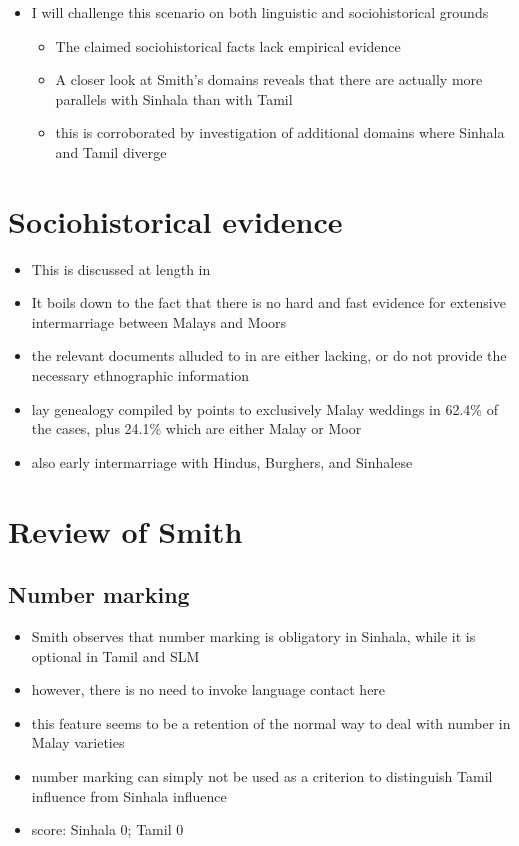 \documentclass[a4paper,12pt]{article}
\begin{document}
\begin{itemize}
 \item I will challenge this scenario on both linguistic and sociohistorical grounds
	\begin{itemize}
	\item The claimed sociohistorical facts lack empirical evidence
	\item A closer look at Smith's domains reveals that there are actually more parallels with Sinhala than with Tamil
	\item this is corroborated by investigation of additional domains where Sinhala and Tamil diverge
	\end{itemize}
\end{itemize}

\section{Sociohistorical evidence}
\begin{itemize}
 \item This is discussed at length in \citet[40-47]{Nordhoff2009phd}
 \item It boils down to the fact that there is no hard and fast evidence for extensive intermarriage between Malays and Moors
 \item the relevant documents alluded to in \citet{Hussainmiya1987,Hussainmiya1990} are either lacking, or do not provide the necessary ethnographic information \citep{Ansaldo2008genesis}
\item lay genealogy compiled by \citet{Burah2006} points to exclusively Malay weddings in 62.4\% of the cases, plus 24.1\% which are either Malay or Moor
\item also early intermarriage with  Hindus, Burghers, and Sinhalese
\end{itemize}

\section{Review of Smith}
\subsection{Number marking}
\begin{itemize}
 \item Smith observes that number marking is obligatory in Sinhala, while it is optional in Tamil and SLM
 \item however, there is no need to invoke language contact here
 \item this feature seems to be a retention of the normal way to deal with number in Malay varieties
 \item number marking can simply not be used as a criterion to distinguish Tamil influence from Sinhala influence
 \item score: Sinhala 0; Tamil 0
\end{itemize}
\end{document}

